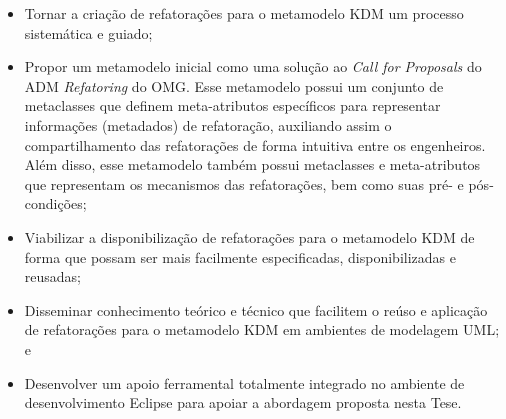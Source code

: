 \begin{itemize}

    \item Tornar a criação de refatorações para o metamodelo KDM um processo sistemática e guiado;
    
    \item Propor um metamodelo inicial como uma solução ao \textit{Call for Proposals} do ADM \textit{Refatoring} do OMG. Esse metamodelo possui um conjunto de metaclasses que definem meta-atributos específicos para representar informações (metadados) de refatoração, auxiliando assim o compartilhamento das refatorações de forma intuitiva entre os engenheiros. Além disso, esse metamodelo também possui metaclasses e meta-atributos que representam os mecanismos das refatorações, bem como suas pré- e pós-condições;
    
    \item Viabilizar a disponibilização de refatorações para o metamodelo KDM de forma que possam ser mais facilmente especificadas, disponibilizadas e reusadas; 
    
    \item Disseminar conhecimento teórico e técnico que facilitem o reúso e aplicação de refatorações para o metamodelo KDM em ambientes de modelagem UML; e
    

	
	
	
	
	
    \item Desenvolver um apoio ferramental totalmente integrado no ambiente de desenvolvimento Eclipse para apoiar a abordagem proposta nesta Tese.

\end{itemize}




